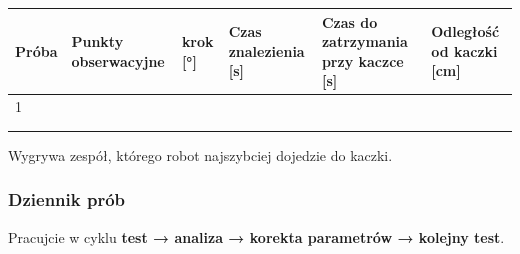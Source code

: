 \par\noindent\begin{minipage}{\linewidth}
\begin{tabular}{@{}
  >{\raggedright\arraybackslash}p{}
  >{\raggedright\arraybackslash}p{}
  >{\raggedright\arraybackslash}p{}
  >{\raggedright\arraybackslash}p{}
  >{\raggedright\arraybackslash}p{}
  >{\raggedright\arraybackslash}p{}@{}}
\toprule\noalign{}
\begin{minipage}[b]{\linewidth}\raggedright
Próba
\end{minipage} & \begin{minipage}[b]{\linewidth}\raggedright
Punkty obserwacyjne
\end{minipage} & \begin{minipage}[b]{\linewidth}\raggedright
krok {[}°{]}
\end{minipage} & \begin{minipage}[b]{\linewidth}\raggedright
Czas znalezienia {[}s{]}
\end{minipage} & \begin{minipage}[b]{\linewidth}\raggedright
Czas do zatrzymania przy kaczce {[}s{]}
\end{minipage} & \begin{minipage}[b]{\linewidth}\raggedright
Odległość od kaczki {[}cm{]}
\end{minipage} \\
\midrule\noalign{}
1 & & & & & \\
2 & & & & & \\
\bottomrule\noalign{}
\end{tabular}
\end{minipage}\par\medskip

Wygrywa zespół, którego robot najszybciej dojedzie do kaczki.

\subsubsection{Dziennik prób}\label{dziennik-pruxf3b}

Pracujcie w cyklu \textbf{test → analiza → korekta parametrów → kolejny test}.

